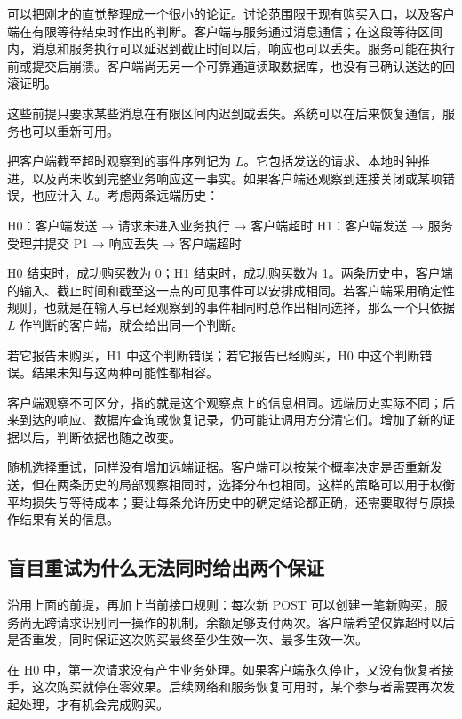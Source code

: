 可以把刚才的直觉整理成一个很小的论证。讨论范围限于现有购买入口，以及客户端在有限等待结束时作出的判断。客户端与服务通过消息通信；在这段等待区间内，消息和服务执行可以延迟到截止时间以后，响应也可以丢失。服务可能在执行前或提交后崩溃。客户端尚无另一个可靠通道读取数据库，也没有已确认送达的回滚证明。

这些前提只要求某些消息在有限区间内迟到或丢失。系统可以在后来恢复通信，服务也可以重新可用。

把客户端截至超时观察到的事件序列记为 $L$。它包括发送的请求、本地时钟推进，以及尚未收到完整业务响应这一事实。如果客户端还观察到连接关闭或某项错误，也应计入 $L$。考虑两条远端历史：

\begin{BookCode}
H0：客户端发送 → 请求未进入业务执行 → 客户端超时
H1：客户端发送 → 服务受理并提交 P1 → 响应丢失 → 客户端超时
\end{BookCode}

H0 结束时，成功购买数为 0；H1 结束时，成功购买数为 1。两条历史中，客户端的输入、截止时间和截至这一点的可见事件可以安排成相同。若客户端采用确定性规则，也就是在输入与已经观察到的事件相同时总作出相同选择，那么一个只依据 $L$ 作判断的客户端，就会给出同一个判断。

若它报告未购买，H1 中这个判断错误；若它报告已经购买，H0 中这个判断错误。结果未知与这两种可能性都相容。



客户端观察不可区分，指的就是这个观察点上的信息相同。远端历史实际不同；后来到达的响应、数据库查询或恢复记录，仍可能让调用方分清它们。增加了新的证据以后，判断依据也随之改变。

随机选择重试，同样没有增加远端证据。客户端可以按某个概率决定是否重新发送，但在两条历史的局部观察相同时，选择分布也相同。这样的策略可以用于权衡平均损失与等待成本；要让每条允许历史中的确定结论都正确，还需要取得与原操作结果有关的信息。

\subsection*{盲目重试为什么无法同时给出两个保证}

沿用上面的前提，再加上当前接口规则：每次新 POST 可以创建一笔新购买，服务尚无跨请求识别同一操作的机制，余额足够支付两次。客户端希望仅靠超时以后是否重发，同时保证这次购买最终至少生效一次、最多生效一次。

在 H0 中，第一次请求没有产生业务处理。如果客户端永久停止，又没有恢复者接手，这次购买就停在零效果。后续网络和服务恢复可用时，某个参与者需要再次发起处理，才有机会完成购买。

